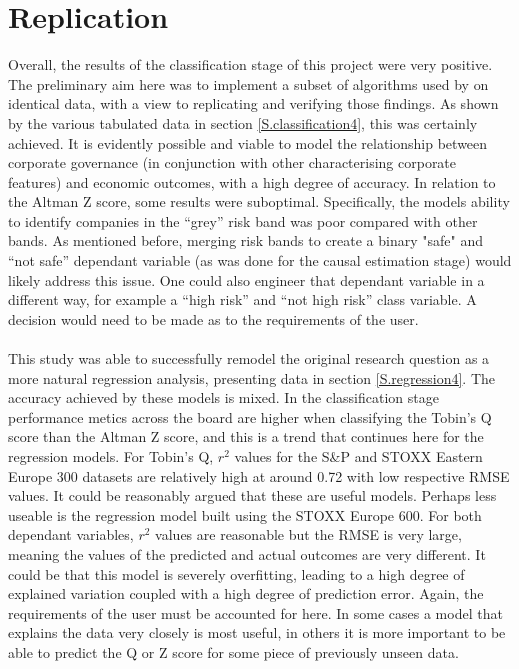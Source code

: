 \section{Replication}
{Overall, the results of the classification stage of this project were very positive. The preliminary aim here was to implement a subset of algorithms used by \cite{moldovan2015learning} on identical data, with a view to replicating and verifying those findings. As shown by the various tabulated data in section \ref{S.classification4}, this was certainly achieved. It is evidently possible and viable to model the relationship between corporate governance (in conjunction with other characterising corporate features) and economic outcomes, with a high degree of accuracy. In relation to the Altman Z score, some results were suboptimal. Specifically, the models ability to identify companies in the ``grey'' risk band was poor compared with other bands. As mentioned before, merging risk bands to create a binary "safe" and ``not safe'' dependant variable (as was done for the causal estimation stage) would likely address this issue. One could also engineer that dependant variable in a different way, for example a ``high risk'' and ``not high risk'' class variable. A decision would need to be made as to the requirements of the user. \\\\
This study was able to successfully remodel the original research question as a more natural regression analysis, presenting data in section \ref{S.regression4}. The accuracy achieved by these models is mixed. In the classification stage performance metics across the board are higher when classifying the Tobin's Q score than the Altman Z score, and this is a trend that continues here for the regression models. For Tobin's Q, $r^2$ values for the S\&P and STOXX Eastern Europe 300 datasets are relatively high at around 0.72 with low respective RMSE values. It could be reasonably argued that these are useful models. Perhaps less useable is the regression model built using the STOXX Europe 600. For both dependant variables, $r^2$ values are reasonable but the RMSE is very large, meaning the values of the predicted and actual outcomes are very different. It could be that this model is severely overfitting, leading to a high degree of explained variation coupled with a high degree of prediction error. Again, the requirements of the user must be accounted for here. In some cases a model that explains the data very closely is most useful, in others it is more important to be able to predict the Q or Z score for some piece of previously unseen data. \\\\
}
